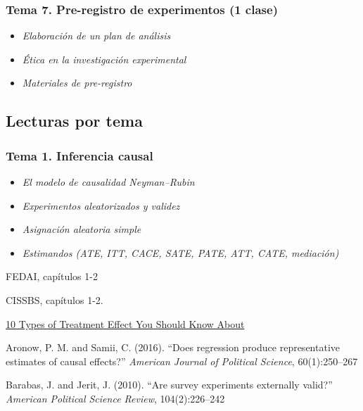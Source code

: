 \documentclass[
  12pt,
]{article}
\providecommand{\tightlist}{%
  \setlength{\itemsep}{0pt}\setlength{\parskip}{0pt}}
\begin{document}
\hypertarget{tema-7.-pre-registro-de-experimentos-1-clase-1}{%
\subsubsection{Tema 7. Pre-registro de experimentos (1
clase)}\label{tema-7.-pre-registro-de-experimentos-1-clase-1}}

\begin{itemize}
\tightlist
\item
  \emph{Elaboración de un plan de análisis}
\item
  \emph{Ética en la investigación experimental}
\item
  \emph{Materiales de pre-registro}
\end{itemize}

\hypertarget{lecturas-por-tema-1}{%
\subsection{Lecturas por tema}\label{lecturas-por-tema-1}}

\hypertarget{tema-1.-inferencia-causal-1}{%
\subsubsection{Tema 1. Inferencia
causal}\label{tema-1.-inferencia-causal-1}}

\begin{itemize}
\tightlist
\item
  \emph{El modelo de causalidad Neyman--Rubin}
\item
  \emph{Experimentos aleatorizados y validez}
\item
  \emph{Asignación aleatoria simple}
\item
  \emph{Estimandos (ATE, ITT, CACE, SATE, PATE, ATT, CATE, mediación)}
\end{itemize}

FEDAI, capítulos 1-2

CISSBS, capítulos 1-2.

\href{https://egap.org/resource/10-types-of-treatment-effect-you-should-know-about/}{10
Types of Treatment Effect You Should Know About}

Aronow, P. M. and Samii, C. (2016). ``Does regression produce
representative estimates of causal effects?'' \emph{American Journal of
Political Science}, 60(1):250--267

Barabas, J. and Jerit, J. (2010). ``Are survey experiments externally
valid?'' \emph{American Political Science Review}, 104(2):226--242
\end{document}
